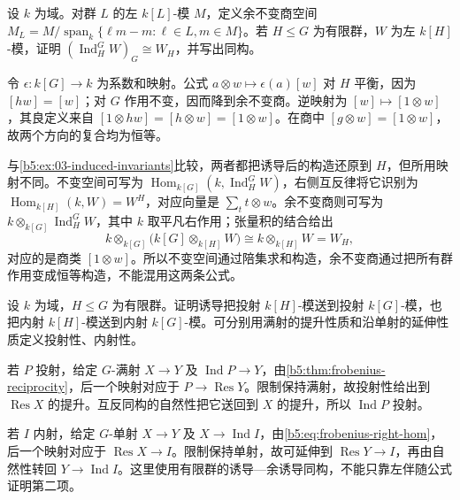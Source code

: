 \begin{exercise}\label{b5:ex:03-induced-coinvariants}
	设 \(k\) 为域。对群 \(L\) 的左 \(k[L]\)-模 \(M\)，定义余不变商空间 \(M_L=M/\operatorname{span}_k\{\ell m-m:\ell\in L,m\in M\}\)。若 \(H\le G\) 为有限群，\(W\) 为左 \(k[H]\)-模，证明 \((\operatorname{Ind}_H^G W)_G\cong W_H\)，并写出同构。
\end{exercise}
\begin{solution}
	令 \(\epsilon:k[G]\rightarrow k\) 为系数和映射。公式 \(a\otimes w\mapsto\epsilon(a)[w]\) 对 \(H\) 平衡，因为 \([hw]=[w]\)；对 \(G\) 作用不变，因而降到余不变商。逆映射为 \([w]\mapsto[1\otimes w]\)，其良定义来自 \([1\otimes hw]=[h\otimes w]=[1\otimes w]\)。在商中 \([g\otimes w]=[1\otimes w]\)，故两个方向的复合均为恒等。

	与\cref{b5:ex:03-induced-invariants}比较，两者都把诱导后的构造还原到 \(H\)，但所用映射不同。不变空间可写为 \(\operatorname{Hom}_{k[G]}(k,\operatorname{Ind}_H^G W)\)，右侧互反律将它识别为 \(\operatorname{Hom}_{k[H]}(k,W)=W^H\)，对应向量是 \(\sum_t t\otimes w\)。余不变商则可写为 \(k\otimes_{k[G]}\operatorname{Ind}_H^G W\)，其中 \(k\) 取平凡右作用；张量积的结合给出
	\[
		k\otimes_{k[G]}\bigl(k[G]\otimes_{k[H]}W\bigr) \cong k\otimes_{k[H]}W=W_H,
	\]
	对应的是商类 \([1\otimes w]\)。所以不变空间通过陪集求和构造，余不变商通过把所有群作用变成恒等构造，不能混用这两条公式。
\end{solution}

\begin{exercise}\label{b5:ex:03-induction-projective-injective}
	设 \(k\) 为域，\(H\le G\) 为有限群。证明诱导把投射 \(k[H]\)-模送到投射 \(k[G]\)-模，也把内射 \(k[H]\)-模送到内射 \(k[G]\)-模。可分别用满射的提升性质和沿单射的延伸性质定义投射性、内射性。
\end{exercise}
\begin{solution}
	若 \(P\) 投射，给定 \(G\)-满射 \(X\rightarrow Y\) 及 \(\operatorname{Ind}P\rightarrow Y\)，由\cref{b5:thm:frobenius-reciprocity}，后一个映射对应于 \(P\rightarrow\operatorname{Res}Y\)。限制保持满射，故投射性给出到 \(\operatorname{Res}X\) 的提升。互反同构的自然性把它送回到 \(X\) 的提升，所以 \(\operatorname{Ind}P\) 投射。

	若 \(I\) 内射，给定 \(G\)-单射 \(X\rightarrow Y\) 及 \(X\rightarrow\operatorname{Ind}I\)，由\eqref{b5:eq:frobenius-right-hom}，后一个映射对应于 \(\operatorname{Res}X\rightarrow I\)。限制保持单射，故可延伸到 \(\operatorname{Res}Y\rightarrow I\)，再由自然性转回 \(Y\rightarrow\operatorname{Ind}I\)。这里使用有限群的诱导—余诱导同构，不能只靠左伴随公式证明第二项。
\end{solution}

